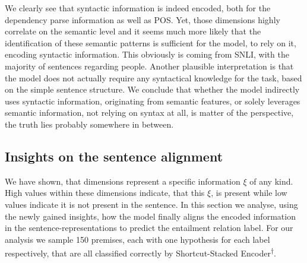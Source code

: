 \noindent
We clearly see that syntactic information is indeed encoded, both for the dependency parse information as well as \ac{POS}. Yet, those dimensions highly correlate on the semantic level and it seems much more likely that the identification of these semantic patterns is sufficient for the model, to rely on it, encoding syntactic information. This obviously is coming from \ac{SNLI}, with the majority of sentences regarding people. Another plausible interpretation is that the model does not actually require any syntactical knowledge for the task, based on the simple sentence structure. We conclude that whether the model indirectly uses syntactic information, originating from semantic features, or solely leverages semantic information, not relying on syntax at all, is matter of the perspective, the truth lies probably somewhere in between. 

\subsection{Insights on the sentence alignment}\label{sec:insights_sent_alignment}
We have shown, that dimensions represent a specific information $\xi$ of any kind. High values within these dimensions indicate, that this $\xi$, is present while low values indicate it is not present in the sentence. In this section we analyse, using the newly gained insights, how the model finally aligns the encoded information in the sentence-representations to predict the entailment relation label. For our analysis we sample 150 premises, each with one hypothesis for each label respectively, that are all classified correctly by Shortcut-Stacked Encoder\textsuperscript{$\dagger$}. 

